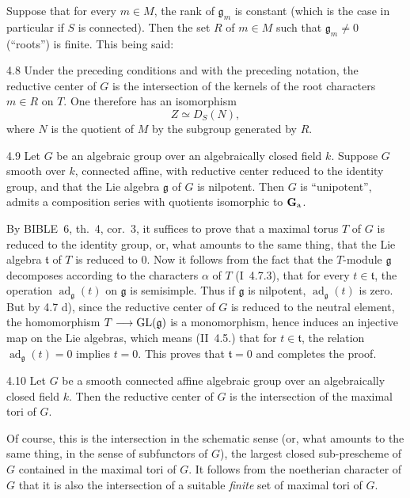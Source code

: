 Suppose that for every $m\in M$, the rank of $\mathfrak g_m$ is constant (which is the case in particular if $S$ is connected). Then the set $R$ of $m\in M$ such that $\mathfrak g_m\ne0$ (``roots'') is finite. This being said:
\begin{corollary}{4.8}\label{XII.4.8}
Under the preceding conditions and with the preceding notation, the reductive center of $G$ is the intersection of the kernels of the root characters $m\in R$ on $T$. One therefore has an isomorphism
\[
Z\simeq D_S(N),
\]
where $N$ is the quotient of $M$ by the subgroup generated by $R$.
\end{corollary}
\begin{corollary}{4.9}\label{XII.4.9}
Let $G$ be an algebraic group over an algebraically closed field $k$. Suppose $G$ smooth over $k$, connected affine, with reductive center reduced to the identity group, and that the Lie algebra $\mathfrak g$ of $G$ is nilpotent. Then $G$ is ``unipotent'', \ie admits a composition series with quotients isomorphic to $\mathbf{G}_{\mathrm{a}}$.
\end{corollary}
By BIBLE~6, th.~4, cor.~3, it suffices to prove that a maximal torus $T$ of $G$ is reduced to the identity group, or, what amounts to the same thing, that the Lie algebra $\mathfrak t$ of $T$ is reduced to $0$. Now it follows from the fact that the $T$-module $\mathfrak g$ decomposes according to the characters $\alpha$ of $T$ (I~4.7.3), that for every $t\in\mathfrak t$, the operation $\operatorname{ad}_{\mathfrak g}(t)$ on $\mathfrak g$ is semisimple. Thus if $\mathfrak g$ is nilpotent, $\operatorname{ad}_{\mathfrak g}(t)$ is zero. But by 4.7 d), since the reductive center of $G$ is reduced to the neutral element, the homomorphism $T\longrightarrow\operatorname{GL}(\mathfrak g)$ is a monomorphism, hence induces an injective map on the Lie algebras, which means (II~4.5.) that for $t\in\mathfrak t$, the relation $\operatorname{ad}_{\mathfrak g}(t)=0$ implies $t=0$. This proves that $\mathfrak t=0$ and completes the proof.
\begin{proposition}{4.10}\label{XII.4.10}
Let $G$ be a smooth connected affine algebraic group over an algebraically closed field $k$. Then the reductive center of $G$ is the intersection of the maximal tori of $G$.
\end{proposition}
Of course, this is the intersection in the schematic sense (or, what amounts to the same thing, in the sense of subfunctors of $G$), \ie the largest closed sub-prescheme of $G$ contained in the maximal tori of $G$. It follows from the noetherian character of $G$ that it is also the intersection of a suitable \emph{finite} set of maximal tori of $G$.

